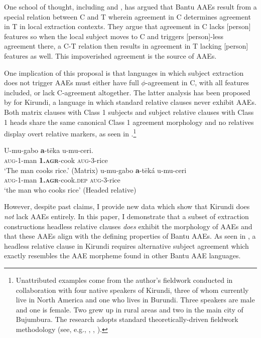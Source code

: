 \documentclass[output=paper,colorlinks,citecolor=brown
]{langscibook}
\begin{document}
   One school of thought, including \citet{BHenderson:2007,BHenderson:2009,BHenderson:2013} and \citet{Diercks:2010}, has argued that Bantu AAEs result from a special relation between C and T wherein agreement in C determines agreement in T in local extraction contexts. They argue that agreement in C lacks [person] features so when the local subject moves to C and triggers [person]-less agreement there, a C-T relation then results in agreement in T lacking [person] features as well. This impoverished agreement is the source of AAEs.
   
   One implication of this proposal is that languages in which subject extraction does not trigger AAEs must either have full $\phi$-agreement in C, with all features included, or lack C-agreement altogether. The latter analysis has been proposed by \citet{BHenderson:2013} for Kirundi, a language in which standard relative clauses never exhibit AAEs. Both matrix clauses with Class 1 subjects and subject relative clauses with Class 1 heads share the same canonical Class 1 agreement morphology and no relatives display overt relative markers, as seen in .\footnote{Unattributed examples come from the author's fieldwork conducted in collaboration with four native speakers of Kirundi, three of whom currently live in North America and one who lives in Burundi. Three speakers are male and one is female. Two grew up in rural areas and two in the main city of Bujumbura. The research adopts standard theoretically-driven fieldwork methodology (see, e.g., \citealt{Matthewson:2004}, \citealt{Bowern:2008}, \citealt{BochnakMatthewson:2020}).}

 \ea  \label{ex:myers:umuceri}
 			\begin{xlist}
\ex \gll	U-mu-gabo {\bfseries  a}-tēka u-mu-ceri. \\
			\textsc{aug}-1-man \textsc{{\bfseries  1.agr}}-cook  \textsc{aug}-3-rice\\  
			\glt `The man cooks rice.'   \hfill{(Matrix)}
\ex		\gll	u-mu-gabo  {\bfseries  a}-tēká u-mu-ceri \\
\textsc{aug}-1-man  \textsc{{\bfseries  1.agr}}-cook.\textsc{dep} \textsc{aug}-3-rice \\ 
		\glt `the man who cooks rice' \hfill{(Headed relative)}  \label{ex:subj}
  \end{xlist}
  \z
 
  However, despite past claims, I provide new data which show that Kirundi does \emph{not} lack AAEs entirely. In this paper, I demonstrate that a subset of extraction constructions \textendash{} headless relative clauses \textendash{} \emph{does} exhibit the morphology of AAEs and that these AAEs align with the defining properties of Bantu AAEs. As seen in , a headless relative clause in Kirundi requires alternative subject agreement which exactly resembles the AAE morpheme found in other Bantu AAE languages.
 
\end{document}
